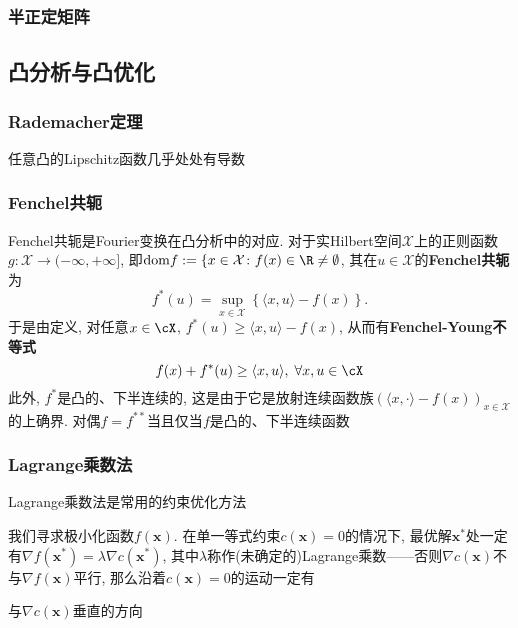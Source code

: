 \subsubsection{半正定矩阵}


\subsection{凸分析与凸优化}

\subsubsection{Rademacher定理}

\begin{theorem}[Rademacher]\label{thm:Rademacher}
	任意凸的Lipschitz函数几乎处处有导数
\end{theorem}


\subsubsection{Fenchel共轭}

Fenchel共轭是Fourier变换在凸分析中的对应. 
对于实Hilbert空间$\mathcal{X}$上的正则函数$g \colon \mathcal{X} \to (-\infty, +\infty]$, 即$\mathrm{dom} f := \{x \in \mathcal{X} \colon f(x) \in \R \neq \emptyset$, 其在$u \in \mathcal{X}$的\textbf{Fenchel共轭}为
\begin{equation}
	f^*(u) = \sup_{x \in \mathcal{X}} \left\{ \langle x, u \rangle - f(x) \right\}. 
\end{equation}
于是由定义, 对任意$x \in \cX$, $f^*(u) \geq \langle x, u \rangle - f(x)$, 从而有\textbf{Fenchel-Young不等式}
\begin{equation}
	f(x) + f^*(u) \geq \langle x, u \rangle,\; \forall x, u \in \cX
\end{equation}
此外, $f^*$是凸的、下半连续的, 这是由于它是放射连续函数族$(\langle x, \cdot \rangle - f(x))_{x \in \mathcal{X}}$的上确界. 
对偶$f = f^{**}$当且仅当$f$是凸的、下半连续函数

\subsubsection{Lagrange乘数法}

Lagrange乘数法是常用的约束优化方法\cite{burges:2004a}

我们寻求极小化函数$f(\bm{x})$. 
在单一等式约束$c(\bm{x}) = 0$的情况下, 最优解$\bm{x}^*$处一定有$\nabla f(\bm{x}^*) = \lambda \nabla c(\bm{x}^*)$, 其中$\lambda$称作(未确定的)Lagrange乘数——否则$\nabla c(\bm{x})$不与$\nabla f(\bm{x})$平行, 那么沿着$c(\bm{x}) = 0$的运动一定有

与$\nabla c(\bm{x})$垂直的方向







































